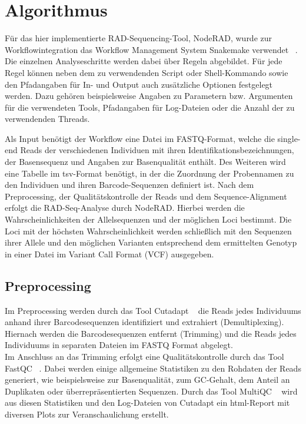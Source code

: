 \chapter{Algorithmus} \label{sec:alg}
Für das hier implementierte RAD-Sequencing-Tool, NodeRAD, wurde zur Workflowintegration das Workflow Management System Snakemake verwendet ~\cite{koester_2012_1, koester_2012_2}. Die einzelnen Analyseschritte werden dabei über Regeln abgebildet. Für jede Regel können neben dem zu verwendenden Script oder Shell-Kommando sowie den Pfadangaben für In- und Output auch zusätzliche Optionen festgelegt werden. Dazu gehören beispielsweise Angaben zu Parametern bzw. Argumenten für die verwendeten Tools, Pfadangaben für Log-Dateien oder die Anzahl der zu verwendenden Threads.

Als Input benötigt der Workflow eine Datei im FASTQ-Format, welche die single-end Reads der verschiedenen Individuen mit ihren Identifikationsbezeichnungen, der Basensequenz und Angaben zur  Basenqualität enthält. Des Weiteren wird eine Tabelle im tsv-Format benötigt, in der die Zuordnung der Probennamen zu den Individuen und ihren Barcode-Sequenzen definiert ist. Nach dem Preprocessing, der Qualitätskontrolle der Reads und dem Sequence-Alignment erfolgt die RAD-Seq-Analyse durch NodeRAD. Hierbei werden die Wahrscheinlichkeiten der Allelsequenzen und der möglichen Loci bestimmt. Die Loci mit der höchsten Wahrscheinlichkeit werden schließlich mit den Sequenzen ihrer Allele und den möglichen Varianten entsprechend dem ermittelten Genotyp in einer Datei im Variant Call Format (VCF) ausgegeben.

\section{Preprocessing} \label{sec:preproc}

Im Preprocessing werden durch das Tool Cutadapt ~\cite{martin_2011} die Reads jedes Individuums anhand ihrer Barcodesequenzen identifiziert und extrahiert (Demultiplexing). Hiernach werden die Barcodesequenzen entfernt (Trimming) und die Reads jedes Individuums in separaten Dateien im FASTQ Format abgelegt. \\
Im Anschluss an das Trimming erfolgt eine Qualitätskontrolle durch das Tool FastQC  ~\cite{andrews_2012}. Dabei werden einige allgemeine Statistiken zu den Rohdaten der Reads generiert, wie beispielsweise zur Basenqualität, zum GC-Gehalt, dem Anteil an Duplikaten oder überrepräsentierten Sequenzen. Durch das Tool MultiQC ~\cite{ewels_2016} wird aus diesen Statistiken und den Log-Dateien von Cutadapt ein html-Report mit diversen Plots zur Veranschaulichung erstellt.

